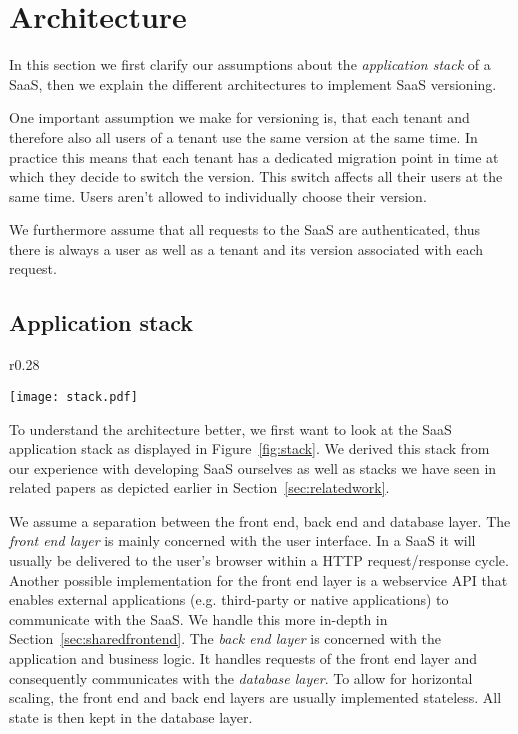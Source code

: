 
\section{Architecture}
\label{sec:architecture}

In this section we first clarify our assumptions about the \emph{application stack} of a SaaS, then we explain the different architectures to implement  SaaS versioning.

One important assumption we make for versioning is, that each tenant and therefore also all users of a tenant use the same version at the same time. In practice this means that each tenant has a dedicated migration point in time at which they decide to switch the version. This switch affects all their users at the same time. Users aren't allowed to individually choose their version.

We furthermore assume that all requests to the SaaS are authenticated, thus there is always a user as well as a tenant and its version associated with each request.

\subsection{Application stack}
\label{sec:stack}

\begin{wrapfigure}{r}{0.28\textwidth}
  \begin{center}
    \texttt{[image: stack.pdf]}
    \caption{Simplified \protect\\ Application Stack}
    \vspace{-20pt}
    \label{fig:stack}
  \end{center}
\end{wrapfigure}


To understand the architecture better, we first want to look at the SaaS application stack as displayed in Figure~\ref{fig:stack}. We derived this stack from our experience with developing SaaS ourselves as well as stacks we have seen in related papers as depicted earlier in Section~\ref{sec:relatedwork}.

We assume a separation between the front end, back end and database layer. The \emph{front end layer} is mainly concerned with the user interface. In a SaaS it will usually be delivered to the user's browser within a HTTP request/response cycle. Another possible implementation for the front end layer is a webservice API that enables external applications (e.g. third-party or native applications) to communicate with the SaaS. We handle this more in-depth in Section~\ref{sec:sharedfrontend}. The \emph{back end layer} is concerned with the application and business logic. It handles requests of the front end layer and consequently communicates with the \emph{database layer}. To allow for horizontal scaling, the front end and back end layers are usually implemented stateless. All state is then kept in the database layer.

